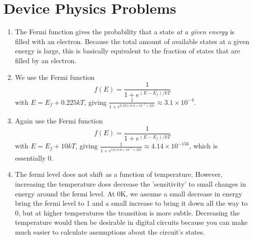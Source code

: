 \documentclass{article}
\begin{document}
\section{Device Physics Problems}
\begin{prob}
\begin{enumerate}
    \item The Fermi function gives the probability that a state \emph{at a given energy} is filled with an electron. Because the total amount of available states at a given energy is large, this is basically equivalent to the fraction of states that are filled by an electron.
\item We use the Fermi function \[f(E)=\frac{1}{1+e^{(E-E_f)/kT}}\] with $E=E_f+0.225kT$, giving $\frac{1}{1+e^{0.225/(8.6\times10^{-5}\times325}}\approx3.1\times10^{-4}$.
    \item Again use the Fermi function \[f(E)=\frac{1}{1+e^{(E-E_f)/kT}}\] with $E=E_f+10kT$, giving $\frac{1}{1+e^{10/(8.6\times10^{-5}\times325}}\approx4.14\times10^{-156}$, which is essentially 0.
    \item The fermi level does not shift as a function of temperature. However, increasing the temperature does decrease the 'sensitivity' to small changes in energy around the fermi level. At 0K, we assume a small decrease in energy bring the fermi level to 1 and a small increase to bring it down all the way to 0, but at higher temperatures the transition is more subtle. Decreasing the temperature would then be desirable in digital circuits because you can make much easier to calculate assumptions about the circuit's states.
\end{enumerate}
\end{prob}
\end{document}
